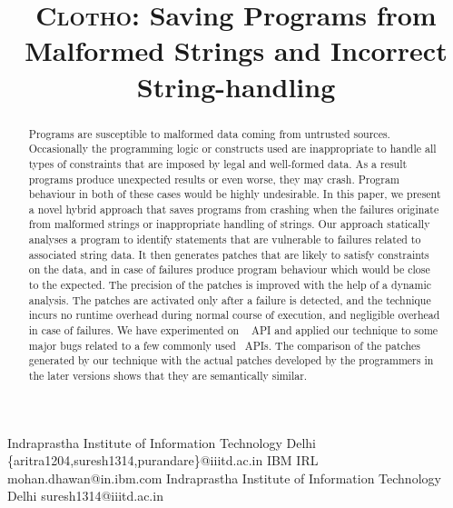 \documentclass[pldi]{sigplanconf}
\def\tool{\textsc{Clotho}\xspace}
\def\papertitle{\tool: Saving Programs from Malformed Strings and Incorrect String-handling}
\begin{document}
\title{\Large \bf \papertitle}

{Indraprastha Institute of Information Technology Delhi}
{\{aritra1204,suresh1314,purandare\}@iiitd.ac.in}
{IBM IRL}
{mohan.dhawan@in.ibm.com}
{Indraprastha Institute of Information Technology Delhi}
{suresh1314@iiitd.ac.in}

\maketitle



\begin{abstract}
\small


Programs are susceptible to malformed data coming from untrusted sources. Occasionally the programming logic or constructs
used are inappropriate to handle all types of constraints that are imposed by legal and well-formed data.
As a result programs produce unexpected results or even worse, they may crash. Program behaviour in both 
of these cases would be highly undesirable. In this paper, we present a 
novel hybrid approach that saves programs from crashing when the failures originate from malformed strings or inappropriate handling of strings.
Our approach statically analyses a program to identify statements that are vulnerable to failures related to associated string data. It then
generates patches that are likely to satisfy constraints on the data, and in case of failures produce program behaviour which would be 
close to the expected. The precision of the patches is improved with the help of a dynamic analysis. The patches are activated only after
a failure is detected, and the technique incurs no runtime overhead during normal course of execution, and negligible overhead in case of failures.
We have experimented on \java\  API and applied our technique to some major bugs related to a few commonly used \java\ APIs.
The comparison of the patches generated by our technique with the actual patches developed by the programmers in the later
versions shows that they are semantically similar.



\end{abstract}
\end{document}
